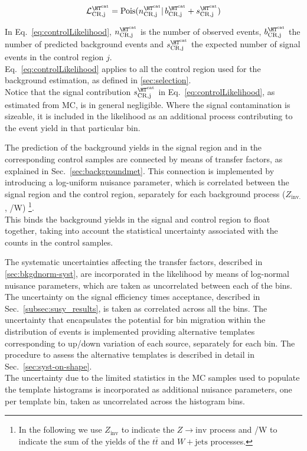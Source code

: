 \begin{equation}
\mathcal{L}^{\htcat}_{\mathrm{CR,j}}=\mathrm{Pois}(n^{\htcat}_{\mathrm{CR,j}} |\, b^{\htcat}_{\mathrm{CR,j}} + s^{\htcat}_{\mathrm{CR,j}})
\label{eq:controlLikelihood}
\end{equation}

In Eq.~\ref{eq:controlLikelihood}, $n^{\htcat}_{\mathrm{CR,j}}$ is the number of observed events, $b^{\htcat}_{\mathrm{CR,j}}$ the number of predicted 
background events and $s^{\htcat}_{\mathrm{CR,j}}$ the expected number of signal events in the control region $j$. \\
Eq.~\ref{eq:controlLikelihood} applies to all the control region used for the background estimation, 
as defined in \ref{sec:selection}. \\
Notice that the signal contribution $s^{\htcat}_{\mathrm{CR,j}}$ in Eq.~\ref{eq:controlLikelihood}, as estimated from MC, is in general negligible. 
Where the signal contamination is sizeable, it is included in the likelihood as an additional process contributing to the event yield in that particular bin.

The prediction of the background yields in the signal region and in the corresponding control samples are connected 
by means of transfer factors, as explained in Sec.~\ref{sec:backgroundmet}. 
This connection is implemented by introducing a log-uniform nuisance parameter, which is correlated 
between the signal region and the control region, separately for each background process ($Z_{\mathrm{inv.}}$, \ttbar/W) \footnote{In the following we use $Z_{\mathrm{inv}}$ to indicate the $Z\to \mathrm{inv}$ process and \ttbar/W to indicate the sum of the yields of the $t\bar{t}$ and $W+\mathrm{jets}$ processes.}. \\
This binds the background yields in the signal and control region to float together, 
taking into account the statistical uncertainty associated with the counts in the control samples. 

The systematic uncertainties affecting the transfer factors, described in \ref{sec:bkgdnorm-syst}, 
are incorporated in the likelihood by means of log-normal nuisance parameters, 
which are taken as uncorrelated between each of the \htcat bins.
The uncertainty on the signal efficiency times acceptance, described in Sec.~\ref{subsec:susy_results}, is taken as correlated across all the \htcat bins. 
The uncertainty that encapsulates the potential for bin migration within the \mht distribution of events is implemented providing alternative templates corresponding to up/down variation of each source, separately for each \htcat bin. The procedure to assess the alternative templates is described in detail in Sec.~\ref{sec:syst-on-shape}. \\
The uncertainty due to the limited statistics in the MC samples used to populate the template histograms is incorporated 
as additional nuisance parameters, one per template bin, taken as uncorrelated across the histogram bins. 

